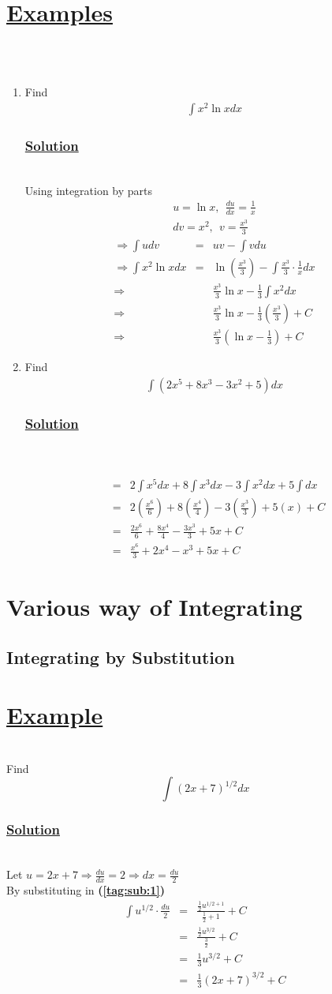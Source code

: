 \documentclass[12pt]{report}
\newcommand{\ubt}[1]{\textbf{\underline{#1}}}
\newcommand{\sps}{\\[0.2cm]}
\newcommand{\spn}[1]{\\[#1cm]}
\newcommand{\refn}[1]{\textbf{(\ref{#1})}}
\newcommand{\dsp}{\displaystyle}
\newcommand{\examples}{\section*{\ubt{Examples}}{~}\spn{-1}}
\newcommand{\solution}{\subsubsection{\ubt{Solution}}{~}\spn{-2}}
\newcommand{\eg}{\section*{\ubt{Example}}{~}\spn{-1}}
\begin{document}
	\examples{~}\\[-1.9cm]
	\begin{enumerate}
		\item 
			Find
			\begin{eqnarray*}
				\int x^2\ln x dx
			\end{eqnarray*}
			\solution
			Using integration by parts
			\begin{gather*}
				u=\ln x, ~~\frac{du}{dx} = \frac{1}{x}\sps
				dv = x^2,~~ v = \frac{x^3}{3}
			\end{gather*}
			\begin{eqnarray*}
				\Rightarrow \int u dv &=& uv - \int vdu\sps
				\Rightarrow \int x^2\ln x dx &=& 	\ln\left(\frac{x^3}{3}\right) - \int\frac{x^3}{3}\cdot \frac{1}{x}dx\sps
				\Rightarrow && \frac{x^3}{3}\ln x - \frac{1}{3}\int x^2 	dx\sps
				\Rightarrow && \frac{x^3}{3}\ln x - 	\frac{1}{3}\left(\frac{x^3}{3}\right) + C \sps
				\Rightarrow && \frac{x^3}{3}\left(\ln x - 	\frac{1}{3}\right) + C
			\end{eqnarray*}
	
		\item
			Find
			\begin{eqnarray*}
				\int (2x^5 + 8x^3 - 3x^2 + 5)dx
			\end{eqnarray*}
			\solution{~}\\[-1.7cm]
			\begin{eqnarray*}
				&=& 2\int x^5 dx + 8\int x^3dx - 3\int x^2 dx + 5\int dx\sps
				&=& 2\left(\frac{x^6}{6}\right)+ 8\left(\frac{x^4}{4}\right) - 3\left(\frac{x^3}{3}\right) + 5(x) + C\sps
				&=& \frac{2x^6}{6} + \frac{8x^4}{4} - \frac{3x^3}{3} + 5x + C\sps
				&=&\frac{x^6}{3} + 2x^4 - x^3 + 5x + C
			\end{eqnarray*}
	\end{enumerate}


	\section{Various way of Integrating}
	\subsection{Integrating by Substitution}
	\eg
	Find 
	\begin{equation}
		\int (2x + 7)^{1/2}dx\tag{1}\label{tag:sub:1}
	\end{equation}
	\solution
	Let $\dsp u=2x + 7 \Rightarrow \frac{du}{dx} = 2 \Rightarrow dx = \frac{du}{2}$ \sps
	By substituting in \refn{tag:sub:1}
	\begin{eqnarray*}
		\int u^{1/2} \cdot \frac{du}{2} &=& \frac{\frac{1}{2} u^{1/2 + 1}}{\frac{1}{2}+1} + C\sps
		&=& \frac{\frac{1}{2}u^{3/2}}{\frac{3}{2}} + C \sps
		&=& \frac{1}{3}u^{3/2} + C\sps
		&=& \frac{1}{3}\left(2x + 7\right)^{3/2} + C
	\end{eqnarray*}
	
\end{document}
